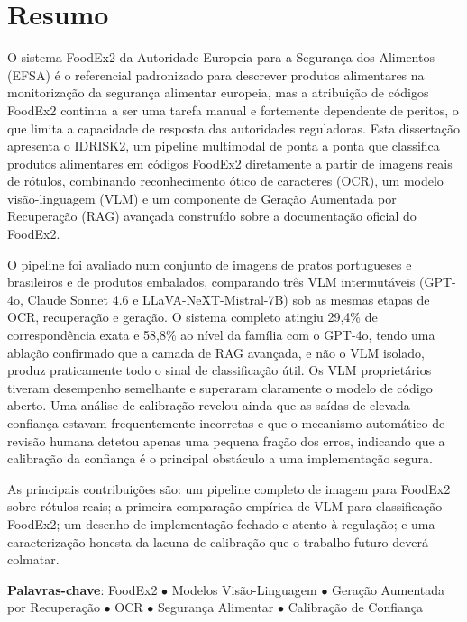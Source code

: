 \chapter*{Resumo}

O sistema FoodEx2 da Autoridade Europeia para a Segurança dos Alimentos (EFSA) é o referencial padronizado para descrever produtos alimentares na monitorização da segurança alimentar europeia, mas a atribuição de códigos FoodEx2 continua a ser uma tarefa manual e fortemente dependente de peritos, o que limita a capacidade de resposta das autoridades reguladoras. Esta dissertação apresenta o IDRISK2, um pipeline multimodal de ponta a ponta que classifica produtos alimentares em códigos FoodEx2 diretamente a partir de imagens reais de rótulos, combinando reconhecimento ótico de caracteres (OCR), um modelo visão-linguagem (VLM) e um componente de Geração Aumentada por Recuperação (RAG) avançada construído sobre a documentação oficial do FoodEx2.

O pipeline foi avaliado num conjunto de imagens de pratos portugueses e brasileiros e de produtos embalados, comparando três VLM intermutáveis (GPT-4o, Claude Sonnet 4.6 e LLaVA-NeXT-Mistral-7B) sob as mesmas etapas de OCR, recuperação e geração. O sistema completo atingiu 29,4\% de correspondência exata e 58,8\% ao nível da família com o GPT-4o, tendo uma ablação confirmado que a camada de RAG avançada, e não o VLM isolado, produz praticamente todo o sinal de classificação útil. Os VLM proprietários tiveram desempenho semelhante e superaram claramente o modelo de código aberto. Uma análise de calibração revelou ainda que as saídas de elevada confiança estavam frequentemente incorretas e que o mecanismo automático de revisão humana detetou apenas uma pequena fração dos erros, indicando que a calibração da confiança é o principal obstáculo a uma implementação segura.

As principais contribuições são: um pipeline completo de imagem para FoodEx2 sobre rótulos reais; a primeira comparação empírica de VLM para classificação FoodEx2; um desenho de implementação fechado e atento à regulação; e uma caracterização honesta da lacuna de calibração que o trabalho futuro deverá colmatar.

\vspace{\fill}
\begin{flushleft}
{\Large \textbf{Palavras-chave}:}
FoodEx2 \(\bullet\)
Modelos Visão-Linguagem \(\bullet\)
Geração Aumentada por Recuperação \(\bullet\)
OCR \(\bullet\)
Segurança Alimentar \(\bullet\)
Calibração de Confiança
\end{flushleft}
\vspace*{24mm}

